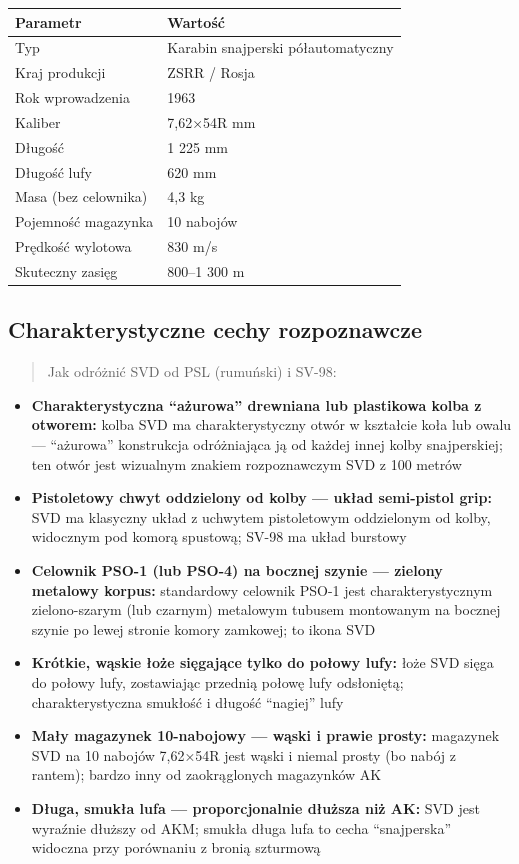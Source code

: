 \documentclass[12pt,oneside]{book}
\providecommand{\tightlist}{%
  \setlength{\itemsep}{0pt}\setlength{\parskip}{0pt}}
\begin{document}
\begin{longtable}[]{@{}ll@{}}
\toprule\noalign{}
Parametr & Wartość \\
\midrule\noalign{}
\endhead
\bottomrule\noalign{}
\endlastfoot
Typ & Karabin snajperski półautomatyczny \\
Kraj produkcji & ZSRR / Rosja \\
Rok wprowadzenia & 1963 \\
Kaliber & 7,62×54R mm \\
Długość & 1 225 mm \\
Długość lufy & 620 mm \\
Masa (bez celownika) & 4,3 kg \\
Pojemność magazynka & 10 nabojów \\
Prędkość wylotowa & 830 m/s \\
Skuteczny zasięg & 800--1 300 m \\
\end{longtable}

\subsection{Charakterystyczne cechy
rozpoznawcze}\label{charakterystyczne-cechy-rozpoznawcze-77}

\begin{quote}
Jak odróżnić SVD od PSL (rumuński) i SV-98:
\end{quote}

\begin{itemize}
\tightlist
\item
  \textbf{Charakterystyczna ``ażurowa'' drewniana lub plastikowa kolba z
  otworem:} kolba SVD ma charakterystyczny otwór w kształcie koła lub
  owalu --- ``ażurowa'' konstrukcja odróżniająca ją od każdej innej
  kolby snajperskiej; ten otwór jest wizualnym znakiem rozpoznawczym SVD
  z 100 metrów
\item
  \textbf{Pistoletowy chwyt oddzielony od kolby --- układ semi-pistol
  grip:} SVD ma klasyczny układ z uchwytem pistoletowym oddzielonym od
  kolby, widocznym pod komorą spustową; SV-98 ma układ burstowy
\item
  \textbf{Celownik PSO-1 (lub PSO-4) na bocznej szynie --- zielony
  metalowy korpus:} standardowy celownik PSO-1 jest charakterystycznym
  zielono-szarym (lub czarnym) metalowym tubusem montowanym na bocznej
  szynie po lewej stronie komory zamkowej; to ikona SVD
\item
  \textbf{Krótkie, wąskie łoże sięgające tylko do połowy lufy:} łoże SVD
  sięga do połowy lufy, zostawiając przednią połowę lufy odsłoniętą;
  charakterystyczna smukłość i długość ``nagiej'' lufy
\item
  \textbf{Mały magazynek 10-nabojowy --- wąski i prawie prosty:}
  magazynek SVD na 10 nabojów 7,62×54R jest wąski i niemal prosty (bo
  nabój z rantem); bardzo inny od zaokrąglonych magazynków AK
\item
  \textbf{Długa, smukła lufa --- proporcjonalnie dłuższa niż AK:} SVD
  jest wyraźnie dłuższy od AKM; smukła długa lufa to cecha
  ``snajperska'' widoczna przy porównaniu z bronią szturmową
\end{itemize}
\end{document}
